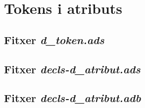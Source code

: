 \section{Tokens i atributs}

\subsection{Fitxer \emph{d\_token.ads}}

\newpage

\subsection{Fitxer \emph{decls-d\_atribut.ads}}

\newpage

\subsection{Fitxer \emph{decls-d\_atribut.adb}}

\newpage
